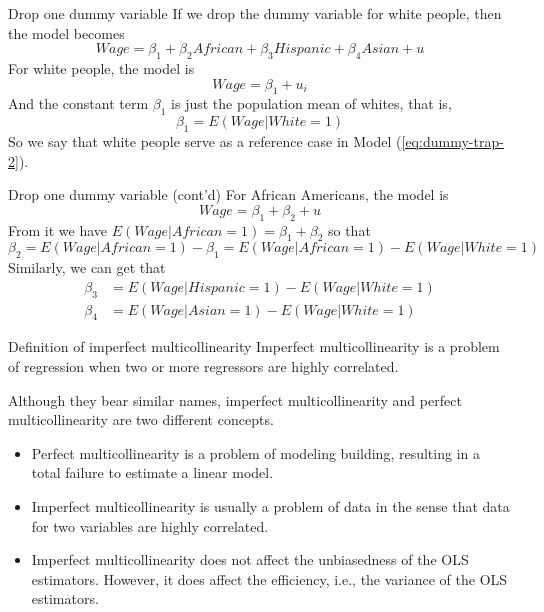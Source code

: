 \documentclass[presentation,10pt]{beamer}
\begin{document}
\begin{frame}[label={sec:org2f61aa7}]{Drop one dummy variable}
If we drop the dummy variable for white people, then the model becomes
\begin{equation}
\label{eq:dummy-trap-2}
Wage = \beta_1 + \beta_2 African + \beta_3 Hispanic + \beta_4 Asian + u
\end{equation}
For white people, the model is
\[Wage = \beta_1 + u_i \]
And the constant term \(\beta_1\) is just the population mean of
whites, that is,
\[\beta_1 = E(Wage | White = 1)\]
So we say that white people
serve as a reference case in Model (\ref{eq:dummy-trap-2}).
\end{frame}

\begin{frame}[label={sec:org8dd31f7}]{Drop one dummy variable (cont'd)}
For African Americans, the model is
\[ Wage = \beta_1 + \beta_2 + u  \]
From it we have \(E(Wage | African=1) = \beta_1 + \beta_2\) so that
\[\beta_2 = E(Wage | African = 1) - \beta_1 = E(Wage | African = 1) -
E(Wage | White = 1)\]
Similarly, we can get that
\begin{align*}
\beta_3 &= E(Wage | Hispanic = 1) - E(Wage | White = 1) \\
\beta_4 &= E(Wage | Asian = 1) - E(Wage | White = 1)
\end{align*}
\end{frame}

\begin{frame}[label={sec:org46a4c2c}]{Definition of imperfect multicollinearity}
\alert{Imperfect multicollinearity} is a problem of regression when two or
more regressors are highly correlated. 

\vspace{0.3cm}
Although they bear similar
names, imperfect multicollinearity and perfect multicollinearity are
two different concepts.
\begin{itemize}
\item Perfect multicollinearity is a problem of modeling building,
resulting in a total failure to estimate a linear model.
\item Imperfect multicollinearity is usually a problem of data in the
sense that data for two variables are highly correlated.
\item Imperfect multicollinearity does not affect the unbiasedness of the
OLS estimators. However, it does affect the efficiency, i.e., the
variance of the OLS estimators.
\end{itemize}
\end{frame}
\end{document}
